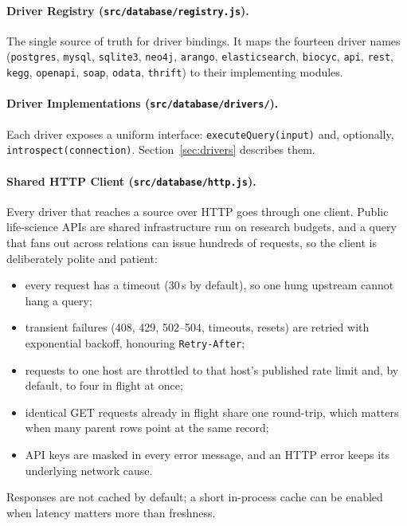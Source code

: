 \documentclass[sigconf,nonacm]{acmart}
\begin{document}
\paragraph{Driver Registry (\textup{\texttt{src/database/registry.js}}).}
The single source of truth for driver bindings.  It maps the fourteen
driver names (\texttt{postgres}, \texttt{mysql}, \texttt{sqlite3},
\texttt{neo4j}, \texttt{arango}, \texttt{elasticsearch},
\texttt{biocyc}, \texttt{api}, \texttt{rest}, \texttt{kegg},
\texttt{openapi}, \texttt{soap}, \texttt{odata}, \texttt{thrift}) to
their implementing modules.

\paragraph{Driver Implementations (\textup{\texttt{src/database/drivers/}}).}
Each driver exposes a uniform interface: \texttt{executeQuery(input)}
and, optionally, \texttt{introspect(connection)}.
Section~\ref{sec:drivers} describes them.

\paragraph{Shared HTTP Client (\textup{\texttt{src/database/http.js}}).}
Every driver that reaches a source over HTTP goes through one client.
Public life-science APIs are shared infrastructure run on research
budgets, and a query that fans out across relations can issue hundreds
of requests, so the client is deliberately polite and patient:
\begin{itemize}
  \item every request has a timeout (30\,s by default), so one hung
        upstream cannot hang a query;
  \item transient failures (408, 429, 502--504, timeouts, resets) are
        retried with exponential backoff, honouring
        \texttt{Retry-After};
  \item requests to one host are throttled to that host's published
        rate limit and, by default, to four in flight at once;
  \item identical GET requests already in flight share one round-trip,
        which matters when many parent rows point at the same record;
  \item API keys are masked in every error message, and an HTTP error
        keeps its underlying network cause.
\end{itemize}
Responses are not cached by default; a short in-process cache can be
enabled when latency matters more than freshness.
\end{document}
